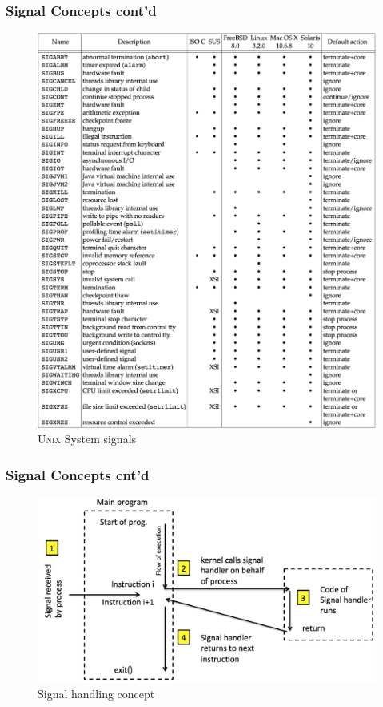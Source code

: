 \documentclass[newPxFont,sthlmFooter,nooffset]{beamer}
\begin{document}
\begin{frame}[t]
  \frametitle{Signal Concepts cont'd}
  \begin{figure}[h]
    \centering
    \includegraphics[width=\linewidth,trim={0 15cm 0 0},clip]{figure/fig10-1_unix_sig.png}
    \caption{\textsc{Unix} System signals}
  \end{figure}
\end{frame}




\begin{frame}[t]
  \frametitle{Signal Concepts cnt'd}
  \begin{figure}[h]
    \centering
    \includegraphics[width=\linewidth]{figure/signal_concept.png}
    \caption{Signal handling concept}
  \end{figure}

\end{frame}
\end{document}
